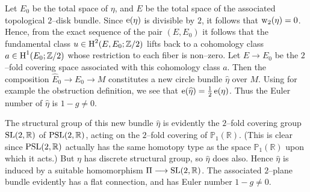\documentclass[../main]{subfiles}
\begin{document}
Let $E_0$ be the total space of $\eta$, and $E$ be the total space of the associated topological $2$--disk bundle. Since $\operatorname{e}(\eta)$ is divisible by $2$, it follows that $\operatorname{w}_2(\eta) = 0$. Hence, from the exact sequence of the pair $(E, E_0)$ it follows that the fundamental class $u \in \operatorname{H}^2(E, E_0; {\mathbb Z}/2)$ lifts back to a cohomology class $a \in \operatorname{H}^1(E_0; {\mathbb Z}/2)$ whose restriction to each fiber is non--zero. Let $E \longrightarrow E_0$ be the $2$--fold covering space associated with this cohomology class $a$. Then the composition ${\widehat E}_0 \longrightarrow E_0 \longrightarrow M$ constitutes a new circle bundle ${\widehat \eta}$ over $M$. Using for example the obstruction definition, we see that $\operatorname{e}({\widehat \eta}) = \tfrac 1 2 \operatorname{e}(\eta)$. Thus the Euler number of ${\widehat \eta}$ is $1 - g \ne 0$. 

The structural group of this new bundle ${\widehat \eta}$ is evidently the $2$--fold covering group $\operatorname{SL}(2, \mathbb R)$ of $\operatorname{PSL}(2, \mathbb R)$, acting on the $2$--fold covering of ${\mathbb P}_1(\mathbb R)$. (This is clear since $\operatorname{PSL}(2, \mathbb R)$ actually has the same homotopy type as the space ${\mathbb P}_1(\mathbb R)$ upon which it acts.) But $\eta$ has discrete structural group, so ${\widehat \eta}$ does also. Hence ${\widehat \eta}$ is induced by a suitable homomorphism $\Pi \longrightarrow \operatorname{SL}(2, \mathbb R)$. The associated $2$--plane bundle evidently has a flat connection, and has Euler number $1 - g \ne 0$.
\end{document}
